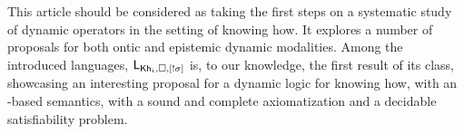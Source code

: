 \begin{mrevised}
\begin{comment}
Another aspect unexploited by the ontic proposals, is the dimension involving plan indistinguishability, the most distinctive feature of our semantics. In this regard, we proposed modalities that remove indistinguishability between plans, reducing the uncertainty of an agent. Similar to what happened to very general dynamic modalities (see e.g.~\cite{ArecesFH15}), axiomatizing these operators turns to be challenging. We showed that for instance in our proposals, uniforme substitution does not hold. To overcome this issue, we propose a new logic featuring two novel operations: a basic modality $[a]$, and a novel dynamic modality that distinguishes the effect of a plan from the rest. The latter emerges as an alternative of more expressive operators, but in which the information about a single plan is revealed, instead of information about two plans being different. For the former, the benefits are twofold. First, it enables us to explicitly talk about the execution of actions. Second, as a by product it provides us the expressivity to obtain an axiomatization via reduction axioms.
\end{comment}

\begin{comment}
To the best of our knowledge, this is the first attempt to establish a theory of dynamic epistemic logics for knowing how. We argue that the semantics provided in~\cite{AFSVQ21,AFSVQ23report} is the crucial aspect for succeeding in this goal. Moreover, our work opens the path to studying other dynamic operators in this context. For instance, we could define dynamic modalities based on action models, like those in~\cite{BaltagMS98,DELbook,GalimullinA22}. 
Also, it would be interesting to explore alternative techniques for obtaining proof systems without a general rule of substitution, for instance, by building a dynamic logic over a hybrid logic semantics (see e.g.~\cite{BenthemMZ2022}). Finally, we would like to characterize the exact complexity of the dynamic logics we introduced.
\end{comment}


This article should be considered as taking the first steps on a systematic study of dynamic operators in the setting of knowing how.  It explores a number of proposals for both ontic and epistemic dynamic modalities. 
Among the introduced languages, $\mathsf{L}_{{\sf Kh}_i,\square,[!\sigma]}$ is,  to our knowledge, the first result of its class, showcasing an interesting proposal for a dynamic logic for knowing how, with an \ults-based semantics, with a sound and complete axiomatization and a decidable satisfiability problem. 


\end{mrevised}
